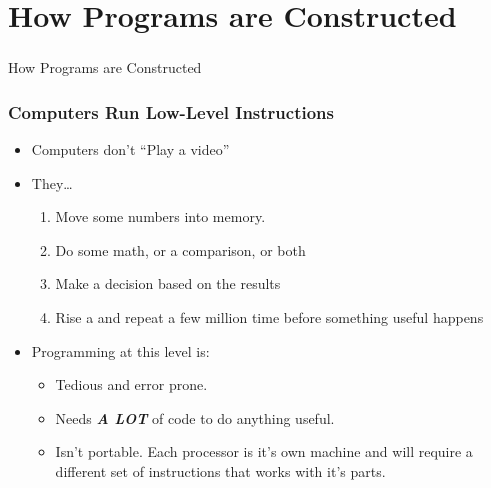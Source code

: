 \documentclass{beamer}
\begin{document}
%
%
%
\section{How Programs are Constructed}
\begin{frame}
  \frametitle{}
  \centering
  \Huge How Programs are Constructed
\end{frame}

%
%

%
%
\begin{frame}
  \frametitle{Computers Run Low-Level Instructions}
  \begin{minipage}{0.75\textwidth}
    \begin{itemize}
      \item Computers don't ``Play a video''
      \item They\ldots
        \begin{enumerate}
          \item Move some numbers into memory.
          \item Do some math, or a comparison, or both
          \item Make a decision based on the results
          \item Rise a and repeat a few million time before something useful happens
        \end{enumerate}
      \item Programming at this level is:
        \begin{itemize}
          \item Tedious and error prone.
          \item Needs \textbf{\textit{A LOT}} of code to do anything useful.
          \item Isn't portable. Each processor is it's own machine and will require a different set of instructions that works with it's parts.
        \end{itemize}
    \end{itemize}
  \end{minipage}
  \begin{minipage}{0.75\textwidth}
  \end{minipage}
\end{frame}
\end{document}
